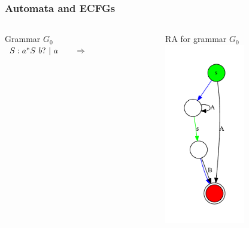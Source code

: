 \documentclass{beamer}
\begin{document}
	\begin{frame} 
		\frametitle{Automata and ECFGs}
		
		\begin{columns}
			\begin{column}{4cm}
				Grammar $G_0$\\
				\vspace{10pt}
				$
				\begin{array}[b]{rl}
				S : a^{*} S\ b? \ | \ a \ \ \ \ \ \  \Rightarrow
				\end{array}
				$
			\end{column}
			\begin{column}{6cm}
				RA for grammar $G_0$\\
				\vspace{10pt}
				\includegraphics[width=3.5cm]{pictures/G0initialAutomaton.pdf}
			\end{column}
		\end{columns}

	\end{frame}
\end{document}
